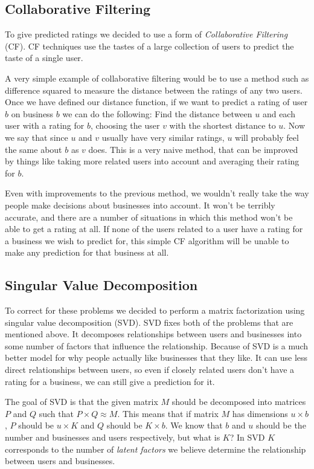 \subsection{Collaborative Filtering}

To give predicted ratings we decided to use a form of \emph{Collaborative
Filtering} (CF). CF techniques use the tastes of a large collection of users to
predict the taste of a single user.

A very simple example of collaborative filtering would be to use a method such
as difference squared to measure the distance between the ratings of any two
users. Once we have defined our distance function, if we want to predict a
rating of user $b$ on business $b$ we can do the following: Find the distance
between $u$ and each user with a rating for $b$, choosing the user $v$ with the
shortest distance to $u$. Now we say that since $u$ and $v$ usually have very
similar ratings, $u$ will probably feel the same about $b$ as $v$ does. This is
a very naive method, that can be improved by things like taking more related
users into account and averaging their rating for $b$.

Even with improvements to the previous method, we wouldn't really take the way
people make decisions about businesses into account. It won't be terribly
accurate, and there are a number of situations in which this method won't be
able to get a rating at all. If none of the users related to a user have a
rating for a business we wish to predict for, this simple CF algorithm will be
unable to make any prediction for that business at all. 

\subsection{Singular Value Decomposition}
To correct for these problems we decided to perform a matrix factorization
using singular value decomposition (SVD)\cite{bellkor}. SVD fixes both of the
problems that are mentioned above. It decomposes relationships between users
and businesses into some number of factors that influence the relationship.
Because of SVD is a much better model for why people actually like businesses
that they like. It can use less direct relationships between users, so even if
closely related users don't have a rating for a business, we can still give a
prediction for it.

The goal of SVD is that the given matrix $M$ should be decomposed into
matrices $P$ and $Q$ such that $P \times Q \approx M $. This means that if
matrix $M$ has dimensions $u \times b$, $P$ should be $u \times K$ and $Q$
should be $K \times b$. We know that $b$ and $u$ should be the number and
businesses and users respectively, but what is $K$? In SVD $K$ corresponds to
the number of \emph{latent factors} we believe determine the relationship
between users and businesses.

